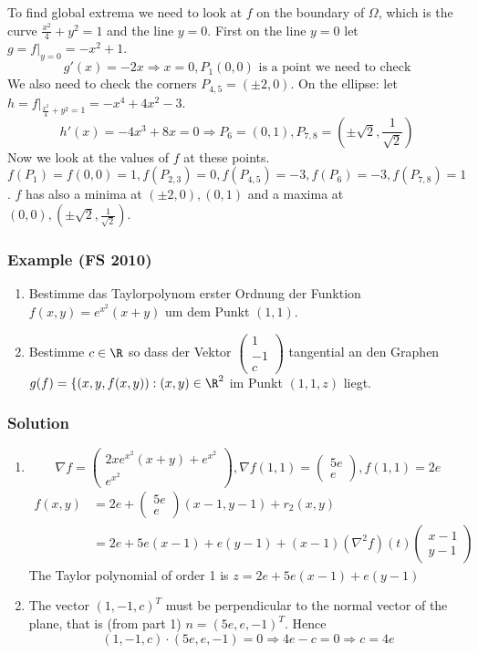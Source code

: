 \documentclass[a4paper]{article}
\begin{document}
To find global extrema we need to look at $f$ on the boundary of $\Omega$, which is the curve $\frac{x^2}{4}+y^2=1$ and the line $y=0$. First on the line $y=0$ let $g=f|_{y=0}=-x^2+1$. $$g'(x)=-2x \Rightarrow x=0, P_1(0,0) \mbox{ is a point we need to check}$$
We also need to check the corners $P_{4,5}=(\pm 2,0)$. On the ellipse: let $h=f|_{\frac{x^2}{4}+y^2=1}=-x^4+4x^2-3$.
$$h'(x)=-4x^3+8x=0 \Rightarrow P_6=(0,1), P_{7,8}=(\pm \sqrt{2}, \frac{1}{\sqrt{2}})$$
Now we look at the values of $f$ at these points. $f(P_1)=f(0,0)=1, f(P_{2,3})=0, f(P_{4,5})=-3, f(P_6)=-3, f(P_{7,8})=1$. $f$ has also a minima at $(\pm 2,0), (0,1)$ and a maxima at $(0,0), (\pm \sqrt{2}, \frac{1}{\sqrt{2}})$.

\subsubsection*{Example (FS 2010)}
\begin{enumerate}
\item Bestimme das Taylorpolynom erster Ordnung der Funktion $f(x,y)=e^{x^2}(x+y)$ um dem Punkt $(1,1)$.
\item Bestimme $c \in \R$ so dass der Vektor $\begin{pmatrix}
1 \\ 
-1 \\ 
c
\end{pmatrix} $ tangential an den Graphen $g(f)=\{(x,y,f(x,y)):(x,y)\in \R^2$ im Punkt $(1,1,z)$ liegt.
\end{enumerate}
\subsubsection*{Solution}
\begin{enumerate}
\item
$$\nabla f=\begin{pmatrix}
2xe^{x^2}(x+y)+e^{x^2} \\ 
e^{x^2}
\end{pmatrix}, \nabla f(1,1)=\begin{pmatrix} 5e \\ e \end{pmatrix}, f(1,1)=2e$$
\begin{align*}
f(x,y)&=2e+\begin{pmatrix} 5e \\ e \end{pmatrix}(x-1,y-1)+r_2(x,y)\\
&=2e+5e(x-1)+e(y-1)+(x-1)(\nabla^2 f)(t)\begin{pmatrix} x-1 \\ y-1 \end{pmatrix}
\end{align*}
The Taylor polynomial of order 1 is $z=2e+5e(x-1)+e(y-1)$
\item The vector $(1, -1, c)^T$ must be perpendicular to the normal vector of the plane, that is (from part 1) $n=(5e, e, -1)^T$. Hence
$$(1, -1, c) \cdot (5e, e, -1)=0 \Rightarrow 4e-c=0 \Rightarrow c=4e$$
\end{enumerate}
\end{document}
